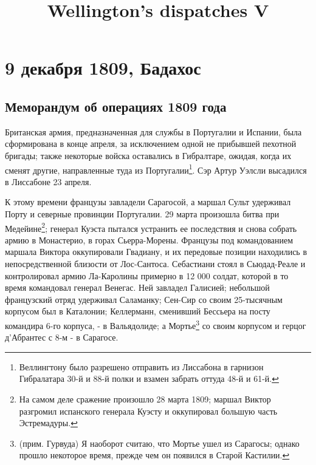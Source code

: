 \documentclass[
  oneside,
  12pt,
  titlepage]{book}
\title{Wellington's dispatches V}
\author{}
\date{\vspace{-2.5em}}
\begin{document}
\maketitle

{
\setcounter{tocdepth}{1}
\tableofcontents
}
\hypertarget{part-9-ux434ux435ux43aux430ux431ux440ux44f-1809-ux431ux430ux434ux430ux445ux43eux441}{%
\part*{9 декабря 1809, Бадахос}\label{part-9-ux434ux435ux43aux430ux431ux440ux44f-1809-ux431ux430ux434ux430ux445ux43eux441}}

\hypertarget{ux43cux435ux43cux43eux440ux430ux43dux434ux443ux43c-ux43eux431-ux43eux43fux435ux440ux430ux446ux438ux44fux445-1809-ux433ux43eux434ux430}{%
\chapter{Меморандум об операциях 1809 года}\label{ux43cux435ux43cux43eux440ux430ux43dux434ux443ux43c-ux43eux431-ux43eux43fux435ux440ux430ux446ux438ux44fux445-1809-ux433ux43eux434ux430}}

Британская армия, предназначенная для службы в Португалии и Испании, была сформирована в конце апреля, за исключением одной не прибывшей пехотной бригады; также некоторые войска оставались в Гибралтаре, ожидая, когда их сменят другие, направленные туда из Португалии\footnote{Веллингтону было разрешено отправить из Лиссабона в гарнизон Гибралатара 30-й и 88-й полки и взамен забрать оттуда 48-й и 61-й.}. Сэр Артур Уэлсли высадился в Лиссабоне 23 апреля.

К этому времени французы завладели Сарагосой, а маршал Сульт удерживал Порту и северные провинции Португалии. 29 марта произошла битва при Медейине\footnote{На самом деле сражение произошло 28 марта 1809; маршал Виктор разгромил испанского генерала Куэсту и оккупировал большую часть Эстремадуры.}; генерал Куэста пытался устранить ее последствия и снова собрать армию в Монастерио, в горах Сьерра-Морены. Французы под командованием маршала Виктора оккупировали Гвадиану, и их передовые позиции находились в непосредственной близости от Лос-Сантоса. Себастиани стоял в Сьюдад-Реале и контролировал армию Ла-Каролины примерно в 12 000 солдат, которой в то время командовал генерал Венегас. Ней завладел Галисией; небольшой французский отряд удерживал Саламанку; Сен-Сир со своим 25-тысячным корпусом был в Каталонии; Келлерманн, сменивший Бессьера на посту командира 6-го корпуса, - в Вальядолиде; а Мортье\footnote{(прим. Гурвуда) Я наоборот считаю, что Мортье ушел из Сарагосы; однако прошло некоторое время, прежде чем он появился в Старой Кастилии.} со своим корпусом и герцог д'Абрантес с 8-м - в Сарагосе.
\end{document}
